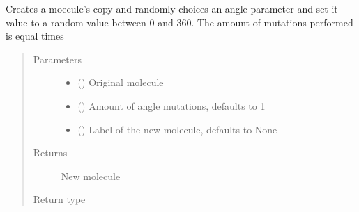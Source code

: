 \documentclass[letterpaper,10pt,english]{sphinxmanual}
\begin{document}

\begin{fulllineitems}
\label{\detokenize{MolOpt.molecular:MolOpt.molecular.molecular.mutate_angles}}
\sphinxAtStartPar
Creates a moecule’s copy and randomly choices an angle parameter and set it value to a random value between 0 and
360. The amount of mutations performed is equal times
\begin{quote}\begin{description}
\item[{Parameters}] \leavevmode\begin{itemize}
\item {} 
\sphinxAtStartPar
{} ({\hyperref[\detokenize{MolOpt.molecular:MolOpt.molecular.molecular.Molecule}]{}}) \textendash{} Original molecule

\item {} 
\sphinxAtStartPar
{} (\sphinxstyleliteralemphasis{\sphinxupquote{, }}) \textendash{} Amount of angle mutations, defaults to 1

\item {} 
\sphinxAtStartPar
{} (\sphinxstyleliteralemphasis{\sphinxupquote{, }}) \textendash{} Label of the new molecule, defaults to None

\end{itemize}

\item[{Returns}] \leavevmode
\sphinxAtStartPar
New molecule

\item[{Return type}] \leavevmode
\sphinxAtStartPar
{\hyperref[\detokenize{MolOpt.molecular:MolOpt.molecular.molecular.Molecule}]{}}

\end{description}\end{quote}

\end{fulllineitems}
\end{document}
